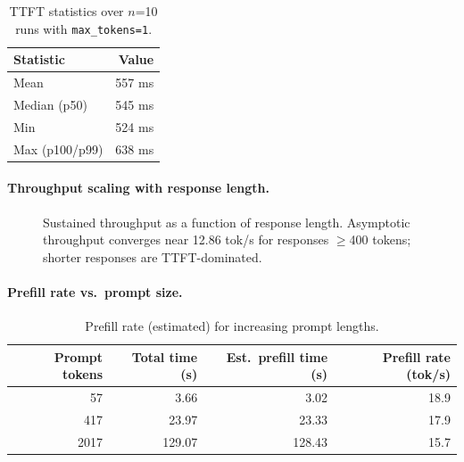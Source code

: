 \documentclass[11pt,a4paper]{article}
\begin{document}
\begin{table}[H]
\centering
\caption{TTFT statistics over $n$=10 runs with \texttt{max\_tokens=1}.}
\begin{tabular}{lr}
\toprule
\textbf{Statistic} & \textbf{Value} \\
\midrule
Mean             & 557 ms \\
Median (p50)     & 545 ms \\
Min              & 524 ms \\
Max (p100/p99)   & 638 ms \\
\bottomrule
\end{tabular}
\end{table}

\paragraph{Throughput scaling with response length.}

\begin{figure}[H]
\centering
{}
\caption{Sustained throughput as a function of response length. Asymptotic throughput converges near 12.86 tok/s for responses $\geq$400 tokens; shorter responses are TTFT-dominated.}
\end{figure}

\paragraph{Prefill rate vs.\ prompt size.}

\begin{table}[H]
\centering
\caption{Prefill rate (estimated) for increasing prompt lengths.}
\begin{tabular}{rrrr}
\toprule
\textbf{Prompt tokens} & \textbf{Total time (s)} & \textbf{Est.\ prefill time (s)} & \textbf{Prefill rate (tok/s)} \\
\midrule
57    & 3.66    & 3.02   & 18.9 \\
417   & 23.97   & 23.33  & 17.9 \\
2017  & 129.07  & 128.43 & 15.7 \\
\bottomrule
\end{tabular}
\end{table}
\end{document}
